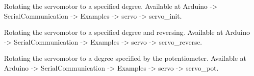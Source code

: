 
\begin{OpenModelicacode}
   {Rotating
    the servomotor to a specified degree. Available at Arduino -> 
    SerialCommunication -> Examples -> servo -> servo\_init.}
  \label{OpenModelica:servo-init}
  
\end{OpenModelicacode}

\begin{OpenModelicacode}
   {Rotating
    the servomotor to a specified degree and reversing.  Available at Arduino -> 
    SerialCommunication -> Examples -> servo -> servo\_reverse.}
  \label{OpenModelica:servo-reverse}
  
\end{OpenModelicacode}

\begin{OpenModelicacode}
  \label{OpenModelica:servo-loop}
  
\end{OpenModelicacode}

\begin{OpenModelicacode}
   {Rotating the servomotor to a degree specified by
    the potentiometer.  Available at Arduino -> 
    SerialCommunication -> Examples -> servo -> servo\_pot.}
  \label{OpenModelica:servo-pot}
  
\end{OpenModelicacode}
